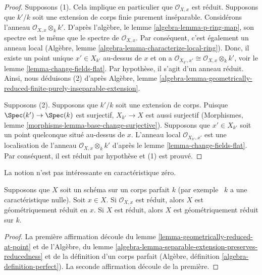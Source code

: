 \begin{proof}
Supposons (1). Cela implique en particulier que
$\mathcal{O}_{X, x}$ est réduit. Supposons que $k'/k$ soit une
extension de corps finie purement inséparable. Considérons
l'anneau $\mathcal{O}_{X, x} \otimes_k k'$. D'après l'algèbre,
le lemme \ref{algebra-lemma-p-ring-map}, son spectre est le
même que le spectre de $\mathcal{O}_{X, x}$. Par conséquent,
c'est également un anneau local (Algèbre, lemme
\ref{algebra-lemma-characterize-local-ring}). Donc, il existe un
point unique $x' \in X_{k'}$ au-dessus de $x$ et on a
$\mathcal{O}_{X_{k'}, x'} \cong \mathcal{O}_{X, x} \otimes_k k'$, voir
le lemme \ref{lemma-change-fields-flat}. Par hypothèse, il s'agit d'un
anneau réduit. Ainsi, nous déduisons (2) d'après Algèbre, lemme
\ref{algebra-lemma-geometrically-reduced-finite-purely-inseparable-extension}.

\medskip\noindent
Supposons (2). Supposons que $k'/k$ soit une extension
de corps. Puisque $\Spec(k') \to \Spec(k)$ est surjectif,
$X_{k'} \to X$ est aussi surjectif (Morphismes, lemme
\ref{morphisms-lemma-base-change-surjective}). Supposons
que $x' \in X_{k'}$ soit un point quelconque situé
au-dessus de $x$. L'anneau local $\mathcal{O}_{X_{k'}, x'}$
est une localisation de l'anneau $\mathcal{O}_{X, x}
\otimes_k k'$ d'après le lemme \ref{lemma-change-fields-flat}.
Par conséquent, il est réduit par hypothèse et (1) est prouvé.
\end{proof}

\noindent
La notion n'est pas intéressante en caractéristique zéro.

\begin{lemma}
\label{lemma-perfect-reduced}
Supposons que $X$ soit un schéma sur un corps parfait $k$ (par
exemple \ $k$ a une caractéristique nulle). Soit $x \in X$. Si
$\mathcal{O}_{X, x}$ est réduit, alors $X$ est géométriquement réduit
en $x$. Si $X$ est réduit, alors $X$ est géométriquement réduit sur $k$.
\end{lemma}

\begin{proof}
La première affirmation découle du lemme
\ref{lemma-geometrically-reduced-at-point} et de
l'Algèbre, du lemme
\ref{algebra-lemma-separable-extension-preserves-reducedness} et de
la définition d'un corps parfait (Algèbre, définition
\ref{algebra-definition-perfect}). La seconde affirmation découle de la première.
\end{proof}

